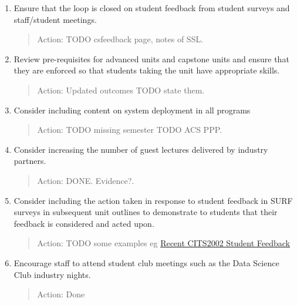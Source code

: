 \begin{enumerate}
\begin{quote}
\color{blue}
{Action: All outcomes were carefully reviewed in 2021, and are regularly reviewed in UWA's annual curriculum review process.}
\end{quote}

\item Ensure that the loop is closed on student feedback from student surveys and staff/student meetings.

\begin{quote}
\color{blue}
{Action: TODO csfeedback page, notes of SSL.}
\end{quote}


\item Review pre-requisites for advanced units and capstone units and ensure that they are
enforced so that students taking the unit have appropriate skills.

\begin{quote}
\color{blue}
{Action: Updated outcomes TODO state them.}
\end{quote}


\item Consider including content on system deployment in all programs

\begin{quote}
\color{blue}
{Action: TODO missing semester TODO ACS PPP.}
\end{quote}

\item Consider increasing the number of guest lectures delivered by industry partners.

\begin{quote}
\color{blue}
{Action: DONE.  Evidence?.}
\end{quote}

\item Consider including the action taken in response to student feedback in SURF surveys in
subsequent unit outlines to demonstrate to students that their feedback is considered and
acted upon.

\begin{quote}
\color{blue}
{Action: TODO some examples eg \hyperlink{https://teaching.csse.uwa.edu.au/units/CITS2002/feedback/}{Recent CITS2002 Student Feedback}
}
\end{quote}


\item Encourage staff to attend student club meetings such as the Data Science Club industry nights.

\begin{quote}
\color{blue}
{Action: Done}
\end{quote}


\end{enumerate}
